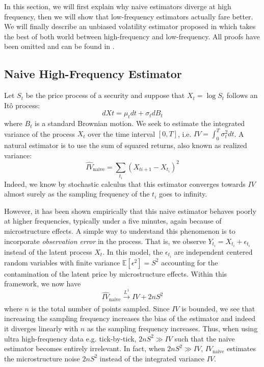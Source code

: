\documentclass[a4paper,12pt,twoside]{article}
\begin{document}
In this section, we will first explain why naive estimators diverge at high frequency, then we will show that low-frequency estimators actually fare better. We will finally describe an unbiased volatility estimator proposed in \cite{princeton} which takes the best of both world between high-frequency and low-frequency. All proofs have been omitted and can be found in \cite{princeton}.
\subsection{Naive High-Frequency Estimator}
Let $S_t$ be the price process of a security and suppose that $X_t=\log S_t$ follows an Itô process: $$dXt = \mu_t dt + \sigma_t dB_t$$ where $B_t$ is a standard Brownian motion.
We seek to estimate the integrated variance of the process $X_t$ over the time interval $[0,T]$, i.e. $IV=\int_0^T\sigma_t^2 dt$. A natural estimator is to use the sum of squared returns, also known as realized variance: $$\hat{IV}_\text{naive}=\sum_{t_i}(X_{t{i+1}}-X_{t_i})^2$$
Indeed, we know by stochastic calculus that this estimator converges towards $IV$ almost surely as the sampling frequency of the $t_i$ goes to infinity.

However, it has been shown empirically that this naive estimator behaves poorly at higher frequencies, typically under a five minutes, again because of microstructure effects. A simple way to understand this phenomenon is to incorporate \textit{observation error} in the process. That is, we observe $Y_{t_i}=X_{t_i}+\epsilon_{t_i}$ instead of the latent process $X_t$. In this model, the $\epsilon_{t_i}$ are independent centered random variables with finite variance $\mathbb{E}[\epsilon^2]=S^2$ accounting for the contamination of the latent price by microstructure effects. Within this framework, we now have $$\hat{IV}_\text{naive} \xrightarrow[]{L^1}IV + 2nS^2$$ where $n$ is the total number of points sampled. Since $IV$ is bounded, we see that increasing the sampling frequency increases the bias of the estimator and indeed it diverges linearly with $n$ as the sampling frequency increases. Thus, when using ultra high-frequency data e.g. tick-by-tick, $2nS^2 \gg IV$ such that the naive estimator becomes entirely irrelevant. In fact, when $2nS^2 \gg IV$, $IV_\text{naive}$ estimates the microstructure noise $2nS^2$ instead of the integrated variance $IV$.
\end{document}
